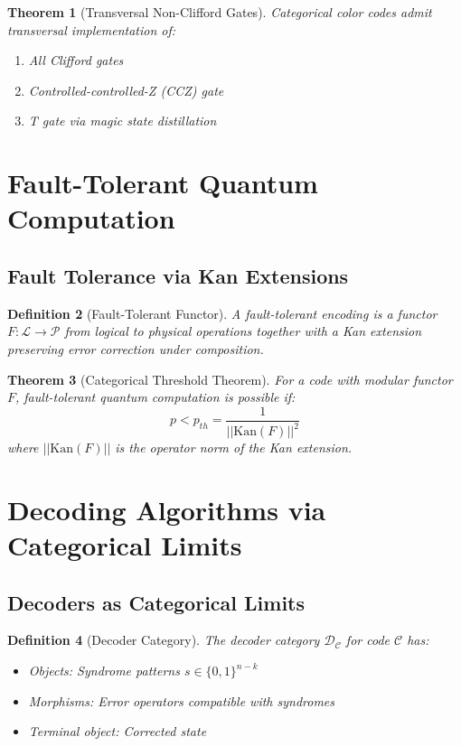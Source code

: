 \documentclass[12pt,a4paper]{article}
\newtheorem{theorem}{Theorem}[section]
\newtheorem{definition}[theorem]{Definition}
\begin{document}
\begin{theorem}[Transversal Non-Clifford Gates]
Categorical color codes admit transversal implementation of:
\begin{enumerate}
\item All Clifford gates
\item Controlled-controlled-Z (CCZ) gate
\item T gate via magic state distillation
\end{enumerate}
\end{theorem}

\section{Fault-Tolerant Quantum Computation}

\subsection{Fault Tolerance via Kan Extensions}

\begin{definition}[Fault-Tolerant Functor]
A fault-tolerant encoding is a functor $F: \mathcal{L} \to \mathcal{P}$ from logical to physical operations together with a Kan extension preserving error correction under composition.
\end{definition}

\begin{theorem}[Categorical Threshold Theorem]
For a code with modular functor $F$, fault-tolerant quantum computation is possible if:
\[
p < p_{th} = \frac{1}{||\text{Kan}(F)||^2}
\]
where $||\text{Kan}(F)||$ is the operator norm of the Kan extension.
\end{theorem}

\section{Decoding Algorithms via Categorical Limits}

\subsection{Decoders as Categorical Limits}

\begin{definition}[Decoder Category]
The decoder category $\mathcal{D}_\mathcal{C}$ for code $\mathcal{C}$ has:
\begin{itemize}
\item Objects: Syndrome patterns $s \in \{0,1\}^{n-k}$
\item Morphisms: Error operators compatible with syndromes
\item Terminal object: Corrected state
\end{itemize}
\end{definition}
\end{document}

